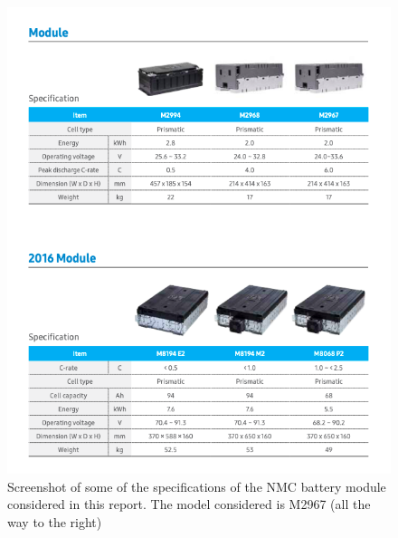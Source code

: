 \documentclass{article}
\begin{document}
\begin{figure}[H]
    \centering
    \includegraphics*[width=1\textwidth]{img/image6.png}
    \caption{Screenshot of some of the specifications of the NMC battery module considered in this report. The model considered is M2967 (all the way to the right) \cite{samsung}
    }
\end{figure}
\end{document}
